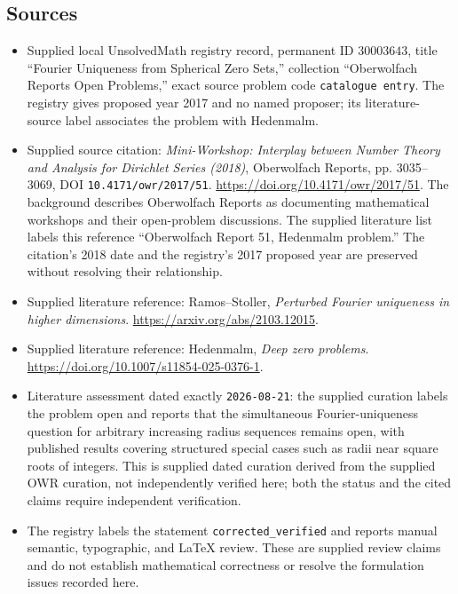 \documentclass[11pt]{article}
\begin{document}
\subsection{Sources}
\begin{itemize}
\item Supplied local UnsolvedMath registry record, permanent ID \(30003643\), title ``Fourier Uniqueness from Spherical Zero Sets,'' collection ``Oberwolfach Reports Open Problems,'' exact source problem code \texttt{catalogue entry}. The registry gives proposed year 2017 and no named proposer; its literature-source label associates the problem with Hedenmalm.
\item Supplied source citation: \emph{Mini-Workshop: Interplay between Number Theory and Analysis for Dirichlet Series (2018)}, Oberwolfach Reports, pp. 3035--3069, DOI \texttt{10.4171/owr/2017/51}. \url{https://doi.org/10.4171/owr/2017/51}. The background describes Oberwolfach Reports as documenting mathematical workshops and their open-problem discussions. The supplied literature list labels this reference ``Oberwolfach Report 51, Hedenmalm problem.'' The citation's 2018 date and the registry's 2017 proposed year are preserved without resolving their relationship.
\item Supplied literature reference: Ramos--Stoller, \emph{Perturbed Fourier uniqueness in higher dimensions}. \url{https://arxiv.org/abs/2103.12015}.
\item Supplied literature reference: Hedenmalm, \emph{Deep zero problems}. \url{https://doi.org/10.1007/s11854-025-0376-1}.
\item Literature assessment dated exactly \texttt{2026-08-21}: the supplied curation labels the problem open and reports that the simultaneous Fourier-uniqueness question for arbitrary increasing radius sequences remains open, with published results covering structured special cases such as radii near square roots of integers. This is supplied dated curation derived from the supplied OWR curation, not independently verified here; both the status and the cited claims require independent verification.
\item The registry labels the statement \texttt{corrected\_verified} and reports manual semantic, typographic, and LaTeX review. These are supplied review claims and do not establish mathematical correctness or resolve the formulation issues recorded here.
\end{itemize}
\end{document}
